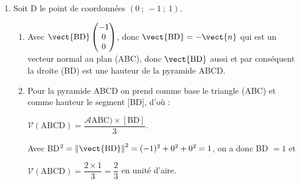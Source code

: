 \begin{enumerate}
\begin{enumerate}
AC$^2 = \left\|\vect{\text{AB}}\right\|^2 = 0^2 + (- 2)^2 + (- 1)^2 = 4 + 1 = 5$.

On a donc AB$^2 = \text{AC}^2 \implies $ AB = AC : le triangle ABC est isocèle en A.
		\item %
		On a H$\left(\dfrac{1+1}{2}~;~\dfrac{(- 1) + (- 1)}{2}~;~\dfrac{1 - 1}{2} \right)$ soit H$(1~;~- 1~;~0)$.
		
On a donc AH$^2 = (1 - 1)^2 + (- 1 - 1)^2 + (0 - 0)^2 = 4$, d'où AH $ = 2$.

ABC étant isocèle en A, la droite (AH) médiane est aussi hauteur relative au côté [BC].

O a donc $\mathcal{A}(\text{ABC}) = \dfrac{\text{BC} \times \text{AH}}{2}$.

Comme BC$^2 = (1 - 1)^2 + (- 1 + 1)^2 + (- 1 - 1)^2 = 0 + 0 + 4$, d'où BC $ = 2$.

Donc $\mathcal{A}(\text{ABC}) = \dfrac{2 \times 2}{2} = 2$.
		
	\end{enumerate}
\item Soit D le point de coordonnées $(0~;~-1~;~1)$.
	\begin{enumerate}
		\item %
		Avec $\vect{\text{BD}}\begin{pmatrix}- 1\\0\\0\end{pmatrix}$, donc $\vect{\text{BD}} = - \vect{n}$ qui est un vecteur normal au plan (ABC), donc $\vect{\text{BD}}$ aussi et par conséquent la droite (BD) est une hauteur de la pyramide ABCD.
		\item %
		Pour la pyramide ABCD on prend comme base le triangle (ABC) et comme hauteur le segment [BD], d'où :
		
		$\mathcal{V}(\text{ABCD}) = \dfrac{\mathcal{A}\text{ABC}) \times [\text{BD}]}{3}$.
		
		Avec BD$^2 = \left\|\vect{\text{BD}}\right\|^2 = (- 1)^2 + 0^2 + 0^2 = 1$, on a donc BD $ = 1$ et 
		
		$\mathcal{V}(\text{ABCD}) = \dfrac{2\times 1}{3} = \dfrac23$ en unité d'aire.
	\end{enumerate}
	
%
\end{enumerate}

\bigskip


